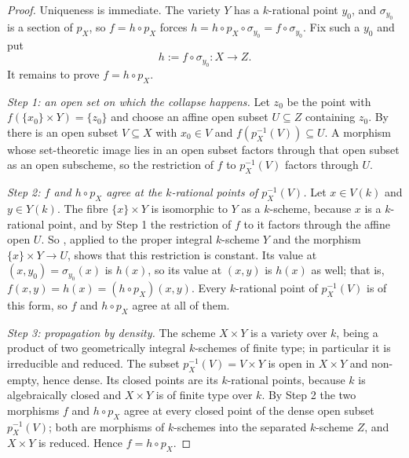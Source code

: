 \begin{proof}
Uniqueness is immediate.  The variety $Y$ has a $k$-rational point $y_0$, and
$\sigma_{y_0}$ is a section of $p_X$, so $f=h\circ p_X$ forces
$h=h\circ p_X\circ\sigma_{y_0}=f\circ\sigma_{y_0}$.  Fix such a $y_0$ and put
\[
  h:=f\circ\sigma_{y_0}\colon X\to Z .
\]
It remains to prove $f=h\circ p_X$.

\emph{Step 1: an open set on which the collapse happens.}  Let $z_0$ be the
point with $f(\{x_0\}\times Y)=\{z_0\}$ and choose an affine open subset
$U\subseteq Z$ containing $z_0$.  By
 there is an open subset $V\subseteq X$
with $x_0\in V$ and $f(p_X^{-1}(V))\subseteq U$.  A morphism whose
set-theoretic image lies in an open subset factors through that open subset as
an open subscheme, so the restriction of $f$ to $p_X^{-1}(V)$ factors through
$U$.

\emph{Step 2: $f$ and $h\circ p_X$ agree at the $k$-rational points of
$p_X^{-1}(V)$.}  Let $x\in V(k)$ and $y\in Y(k)$.  The fibre
$\{x\}\times Y$ is isomorphic to $Y$ as a $k$-scheme, because $x$ is a
$k$-rational point, and by Step 1 the restriction of $f$ to it factors through
the affine open $U$.  So , applied to the
proper integral $k$-scheme $Y$ and the morphism $\{x\}\times Y\to U$, shows
that this restriction is constant.  Its value at
$(x,y_0)=\sigma_{y_0}(x)$ is $h(x)$, so its value at $(x,y)$ is $h(x)$ as
well; that is, $f(x,y)=h(x)=(h\circ p_X)(x,y)$.  Every $k$-rational point of
$p_X^{-1}(V)$ is of this form, so $f$ and $h\circ p_X$ agree at all of them.

\emph{Step 3: propagation by density.}  The scheme $X\times Y$ is a variety
over $k$, being a product of two geometrically integral $k$-schemes of finite
type; in particular it is irreducible and reduced.  The subset
$p_X^{-1}(V)=V\times Y$ is open in $X\times Y$ and non-empty, hence dense.
Its closed points are its $k$-rational points, because $k$ is algebraically
closed and $X\times Y$ is of finite type over $k$.  By Step 2 the two
morphisms $f$ and $h\circ p_X$ agree at every closed point of the dense open
subset $p_X^{-1}(V)$; both are morphisms of $k$-schemes into the separated
$k$-scheme $Z$, and $X\times Y$ is reduced.  Hence $f=h\circ p_X$.
\end{proof}

